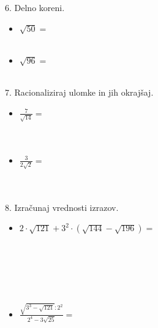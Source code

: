         \begin{frame}[t]
            \begin{alertblock}{6. Delno koreni.}
                \begin{itemize}
                    \item $\sqrt{50}=$ \\ ~ \\
                    \item $\sqrt{96}=$ \\ ~ \\
                \end{itemize}
            \end{alertblock}

            \begin{alertblock}{7. Racionaliziraj ulomke in jih okrajšaj.}
                \begin{itemize}
                    \item $\frac{7}{\sqrt{14}}=$ \\ ~ \\ ~ \\
                    \item $\frac{3}{2\sqrt{2}}=$ \\ ~ \\ ~ \\
                \end{itemize}
            \end{alertblock}
        \end{frame}

        
        \begin{frame}[t]
            \begin{alertblock}{8. Izračunaj vrednosti izrazov.}
                \begin{itemize}
                    \item $2\cdot\sqrt{121}+3^2\cdot\left(\sqrt{144}-\sqrt{196}\right)=$ \\~ \\ ~ \\ ~ \\ ~ \\ ~ \\
                    \item $\frac{\sqrt{3^3-\sqrt{121}}:2^2}{2^4-3\sqrt{25}}=$ \\ ~ \\ ~ \\ ~ \\ ~ \\ ~ \\
                \end{itemize}
            \end{alertblock}
        \end{frame}